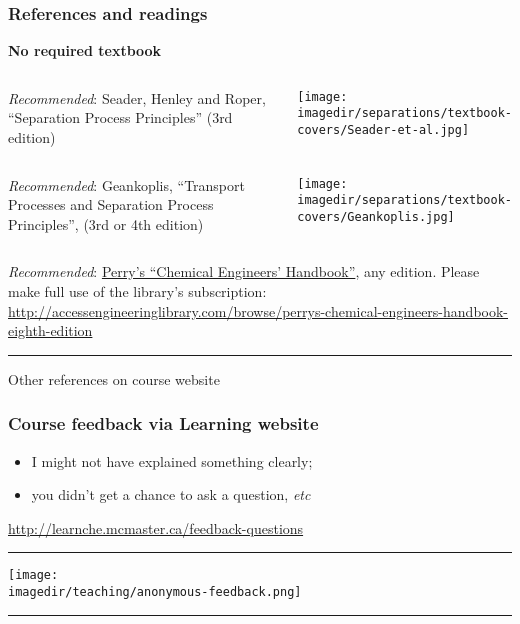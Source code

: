 \begin{frame}\frametitle{References and readings}

	\begin{centering}
		\textbf{No required textbook}
	\end{centering}
	
	\vspace{12pt}
	\begin{columns}[t]
			\emph{Recommended}: Seader, Henley and Roper, ``Separation Process Principles'' (3rd edition)
			\vspace{-1cm}
			\begin{center}
				\texttt{[image: \\imagedir/separations/textbook-covers/Seader-et-al.jpg]}
			\end{center}
	\end{columns}

	\vspace{6pt}
	\begin{columns}[t]
			\emph{Recommended}: Geankoplis, ``Transport Processes and Separation Process Principles'', (3rd or 4th edition)
			\vspace{-1cm}
			\begin{center}
				\texttt{[image: \\imagedir/separations/textbook-covers/Geankoplis.jpg]}
			\end{center}
	\end{columns}

	\vspace{6pt}
	\emph{Recommended}: \href{http://accessengineeringlibrary.com/browse/perrys-chemical-engineers-handbook-eighth-edition}{Perry's ``Chemical Engineers' Handbook''}, any edition. Please make full use of the library's subscription: \\
	\href{http://accessengineeringlibrary.com/browse/perrys-chemical-engineers-handbook-eighth-edition}{\tiny http://accessengineeringlibrary.com/browse/perrys-chemical-engineers-handbook-eighth-edition}


	\vspace{6pt}\hrule\vspace{6pt}
	Other references on course website

\end{frame}

\begin{frame}\frametitle{Course feedback via Learning website}
	\begin{itemize}
		\item	I might not have explained something clearly;
		\item	you didn't get a chance to ask a question, \emph{etc}
	\end{itemize}
	\href{http://learnche.mcmaster.ca/feedback-questions}{http://learnche.mcmaster.ca/feedback-questions}
	\vspace{12pt}
	\hrule
	\begin{center}
		\texttt{[image: \\imagedir/teaching/anonymous-feedback.png]}
	\end{center}
	\hrule
\end{frame}

